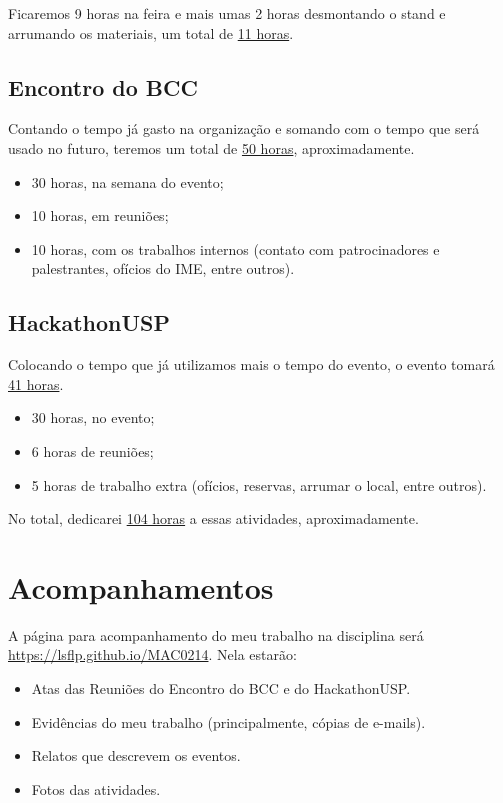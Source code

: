 \documentclass[12pt,letterpaper]{article}
\begin{document}
	Ficaremos 9 horas na feira e mais umas 2 horas desmontando o stand e arrumando os materiais, um total de \underline{11 horas}.
	
	\subsection{Encontro do BCC}
	
	Contando o tempo já gasto na organização e somando com o tempo que será usado no futuro, teremos um total de \underline{50 horas}, aproximadamente.
	\begin{itemize}
		\item 30 horas, na semana do evento;
		\item 10 horas, em reuniões;
		\item 10 horas, com os trabalhos internos (contato com patrocinadores e palestrantes, ofícios do IME, entre outros).
	\end{itemize}
	
	\subsection{HackathonUSP}
	
	Colocando o tempo que já utilizamos mais o tempo do evento, o evento tomará \underline{41 horas}.
	\begin{itemize}
		\item 30 horas, no evento;
		\item 6 horas de reuniões; 
		\item 5 horas de trabalho extra (ofícios, reservas, arrumar o local, entre outros).
	\end{itemize}
	
	No total, dedicarei \underline{104 horas} a essas atividades, aproximadamente.
	
	\section{Acompanhamentos}
	
	A página para acompanhamento do meu trabalho na disciplina será \url{https://lsflp.github.io/MAC0214}. Nela estarão:
	
	\begin{itemize}
		\item Atas das Reuniões do Encontro do BCC e do HackathonUSP.
		\item Evidências do meu trabalho (principalmente, cópias de e-mails).
		\item Relatos que descrevem os eventos.
		\item Fotos das atividades.
	\end{itemize}

			 
\end{document}
